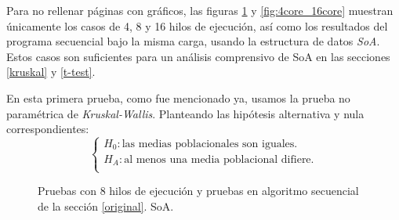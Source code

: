 \documentclass{article}
\begin{document}
Para no rellenar páginas con gráficos, las figuras \ref{fig:8core_p_1} y \ref{fig:4core_16core} muestran únicamente los casos de 4, 8 y 16 hilos de ejecución, así como los resultados del programa
secuencial bajo la misma carga, usando la estructura de datos \textit{SoA}. Estos casos son suficientes
para un análisis comprensivo de SoA en las secciones \ref{kruskal} y \ref{t-test}.


En esta primera prueba, como fue mencionado ya, usamos la prueba no paramétrica de \textit{Kruskal-Wallis}. Planteando
las hipótesis alternativa y nula correspondientes:
\begin{displaymath}
\begin{cases}
	{H_0}: \text{las medias poblacionales son iguales.}\\
	{H_A}: \text{al menos una media poblacional difiere.}\\
\end{cases}
\end{displaymath}
\begin{figure}[htp]
	\hspace*{-3.5cm}
	\caption{Pruebas con 8 hilos de ejecución y pruebas en algoritmo secuencial de la sección \ref{original}. SoA.}
	\label{fig:8core_p_1}
\end{figure}
\end{document}
